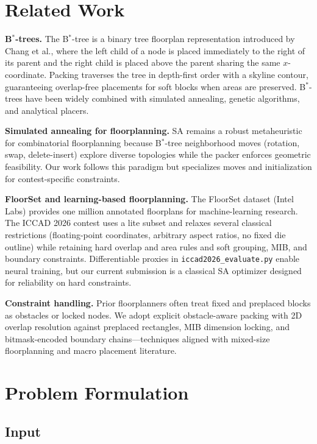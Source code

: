 \documentclass[11pt]{article}
\begin{document}
\section{Related Work}

\textbf{B$^*$-trees.} The B$^*$-tree is a binary tree floorplan representation introduced by Chang et al., where the left child of a node is placed immediately to the right of its parent and the right child is placed above the parent sharing the same $x$-coordinate. Packing traverses the tree in depth-first order with a skyline contour, guaranteeing overlap-free placements for soft blocks when areas are preserved. B$^*$-trees have been widely combined with simulated annealing, genetic algorithms, and analytical placers.

\textbf{Simulated annealing for floorplanning.} SA remains a robust metaheuristic for combinatorial floorplanning because B$^*$-tree neighborhood moves (rotation, swap, delete-insert) explore diverse topologies while the packer enforces geometric feasibility. Our work follows this paradigm but specializes moves and initialization for contest-specific constraints.

\textbf{FloorSet and learning-based floorplanning.} The FloorSet dataset (Intel Labs) provides one million annotated floorplans for machine-learning research. The ICCAD 2026 contest uses a lite subset and relaxes several classical restrictions (floating-point coordinates, arbitrary aspect ratios, no fixed die outline) while retaining hard overlap and area rules and soft grouping, MIB, and boundary constraints. Differentiable proxies in \texttt{iccad2026\_evaluate.py} enable neural training, but our current submission is a classical SA optimizer designed for reliability on hard constraints.

\textbf{Constraint handling.} Prior floorplanners often treat fixed and preplaced blocks as obstacles or locked nodes. We adopt explicit obstacle-aware packing with 2D overlap resolution against preplaced rectangles, MIB dimension locking, and bitmask-encoded boundary chains---techniques aligned with mixed-size floorplanning and macro placement literature.

\section{Problem Formulation}

\subsection{Input}
\end{document}
